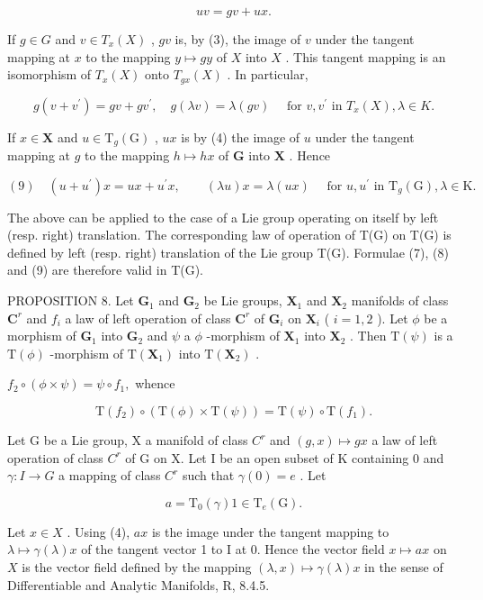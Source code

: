 \[
u v = g v + u x.\tag{7}
\]

If \(g \in G\) and \(v \in T_x(X)\) , \(gv\) is, by (3), the image of \(v\) under the tangent mapping at \(x\) to the mapping \(y \mapsto gy\) of \(X\) into \(X\) . This tangent mapping is an isomorphism of \(T_x(X)\) onto \(T_{gx}(X)\) . In particular,

\[
g (v + v ^ {\prime}) = g v + g v ^ {\prime}, \quad g (\lambda v) = \lambda (g v) \quad \text { for } v, v ^ {\prime} \text { in } T _ {x} (X), \lambda \in K.\tag{8}
\]

If \(x \in \mathbf{X}\) and \(u \in \mathrm{T}_g(\mathrm{G})\) , \(ux\) is by (4) the image of \(u\) under the tangent mapping at \(g\) to the mapping \(h \mapsto hx\) of \(\mathbf{G}\) into \(\mathbf{X}\) . Hence

\[
(9) \quad (u + u ^ {\prime}) x = u x + u ^ {\prime} x, \qquad (\lambda u) x = \lambda (u x) \quad \text { for } u, u ^ {\prime} \text { in } \mathrm{T} _ {g} (\mathrm{G}), \lambda \in \mathrm{K}.
\]

The above can be applied to the case of a Lie group operating on itself by left (resp. right) translation. The corresponding law of operation of T(G) on T(G) is defined by left (resp. right) translation of the Lie group T(G). Formulae (7), (8) and (9) are therefore valid in T(G).

PROPOSITION 8. Let \(\mathbf{G}_1\) and \(\mathbf{G}_2\) be Lie groups, \(\mathbf{X}_1\) and \(\mathbf{X}_2\) manifolds of class \(\mathbf{C}^r\) and \(f_i\) a law of left operation of class \(\mathbf{C}^r\) of \(\mathbf{G}_i\) on \(\mathbf{X}_i\) ( \(i = 1, 2\) ). Let \(\phi\) be a morphism of \(\mathbf{G}_1\) into \(\mathbf{G}_2\) and \(\psi\) a \(\phi\) -morphism of \(\mathbf{X}_1\) into \(\mathbf{X}_2\) . Then \(\mathrm{T}(\psi)\) is a \(\mathrm{T}(\phi)\) -morphism of \(\mathrm{T}(\mathbf{X}_1)\) into \(\mathrm{T}(\mathbf{X}_2)\) .

\(f_{2}\circ (\phi \times \psi) = \psi \circ f_{1},\) whence

\[
\mathrm{T} (f _ {2}) \circ (\mathrm{T} (\phi) \times \mathrm{T} (\psi)) = \mathrm{T} (\psi) \circ \mathrm{T} (f _ {1}).
\]

Let G be a Lie group, X a manifold of class \(C^{r}\) and \((g, x) \mapsto gx\) a law of left operation of class \(C^{r}\) of G on X. Let I be an open subset of K containing 0 and \(\gamma: I \to G\) a mapping of class \(C^{r}\) such that \(\gamma(0) = e\) . Let

\[
a = \mathrm{T} _ {0} (\gamma) 1 \in \mathrm{T} _ {e} (\mathrm{G}).
\]

Let \(x \in X\) . Using (4), \(ax\) is the image under the tangent mapping to \(\lambda \mapsto \gamma(\lambda)x\) of the tangent vector 1 to I at 0. Hence the vector field \(x \mapsto ax\) on \(X\) is the vector field defined by the mapping \((\lambda, x) \mapsto \gamma(\lambda)x\) in the sense of Differentiable and Analytic Manifolds, R, 8.4.5.
